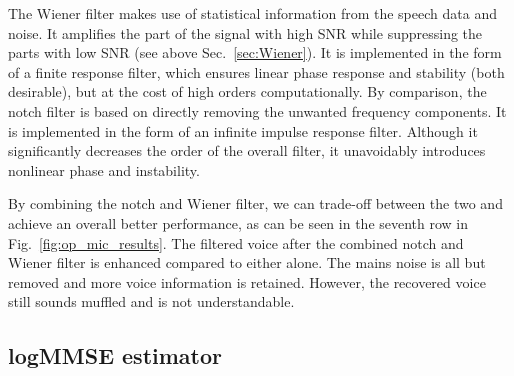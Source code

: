 \documentclass[aps,pra,superscriptaddress,reprint,nofootinbib]{revtex4-1}
\begin{document}
The Wiener filter makes use of statistical information from the speech data and noise. It amplifies the part of the signal with high SNR while suppressing the parts with low SNR (see above Sec.~\ref{sec:Wiener}). It is implemented in the form of a finite response filter, which ensures linear phase response and stability (both desirable), but at the cost of high orders computationally. By comparison, the notch filter is based on directly removing the unwanted frequency components. It is implemented in the form of an infinite impulse response filter. Although it significantly decreases the order of the overall filter, it unavoidably introduces nonlinear phase and instability. 


By combining the notch and Wiener filter, we can trade-off between the two and achieve an overall better performance, as can be seen in the seventh row in Fig.~\ref{fig:op_mic_results}.
The filtered voice after the combined notch and Wiener filter is enhanced compared to either alone. 
The mains noise is all but removed and more voice information is retained. 
However, the recovered voice still sounds muffled and is not understandable.





\subsection{logMMSE estimator}
\label{sec:logmmse}
\end{document}
